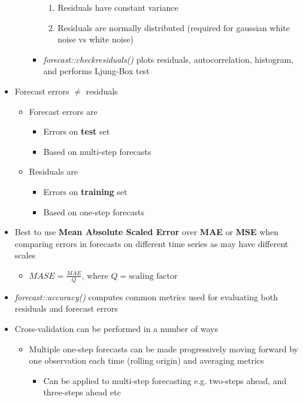 \documentclass{article}\usepackage[]{graphicx}\usepackage[]{color}
\begin{document}
\begin{itemize}
\begin{itemize}
\begin{itemize}
\begin{enumerate}
                \item Residuals have constant variance
                \item Residuals are normally distributed (required for gaussian white noise vs white noise)
            \end{enumerate}
            \item \textit{forecast::checkresiduals()} plots residuals, autocorrelation, histogram, and performs Ljung-Box test
        \end{itemize}
    \end{itemize}
    \item Forecast errors $\neq$ residuals
    \begin{itemize}
        \item Forecast errors are 
        \begin{itemize}
            \item Errors on \textbf{test} set
            \item Based on multi-step forecasts
        \end{itemize} 
        \item Residuals are 
        \begin{itemize}
            \item Errors on \textbf{training} set
            \item Based on one-step forecasts
        \end{itemize}
    \end{itemize}
    \item Best to use \textbf{Mean Absolute Scaled Error} over \textbf{MAE} or \textbf{MSE} when comparing errors in forecasts on different time series as may have different scales
    \begin{itemize}
        \item $MASE = \frac{MAE}{Q} \text{, where } Q = \text{scaling factor}$
    \end{itemize}
    \item \textit{forecast::accuracy()} computes common metrics used for evaluating both residuals and forecast errors
    \item Cross-validation can be performed in a number of ways
    \begin{itemize}
        \item Multiple one-step forecasts can be made progressively moving forward by one observation each time (rolling origin) and averaging metrics
        \begin{itemize}
            \item Can be applied to multi-step forecasting e.g. two-steps ahead, and three-steps ahead etc

\end{itemize}
\end{itemize}
\end{itemize}
\end{document}
